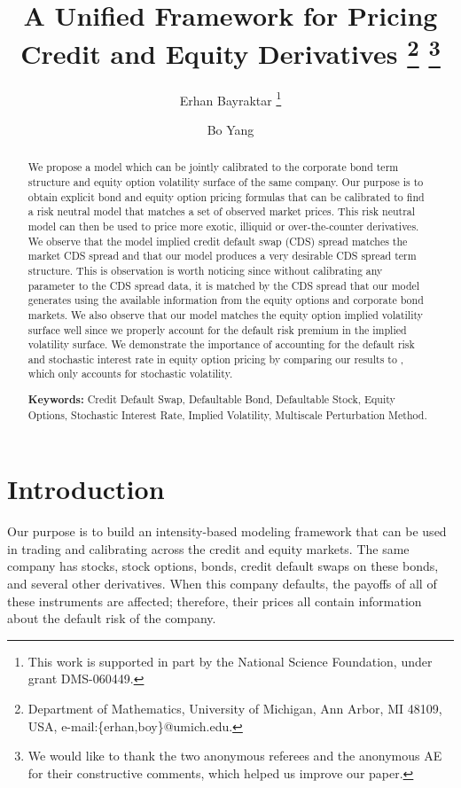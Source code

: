 \documentclass[11pt]{article}
\title{\LARGE \bf
\sc A Unified Framework for Pricing Credit and Equity Derivatives \thanks{Department of Mathematics, University
of Michigan, Ann Arbor, MI 48109, USA, e-mail:\{erhan,boy\}@umich.edu.} \thanks{We would like to thank the two anonymous referees and the anonymous AE for their constructive comments, which helped us improve our paper.} }
\author{Erhan Bayraktar \thanks{This
work is supported in part by the National Science Foundation,
under grant DMS-060449.} \and Bo Yang}
\date{}
\numberwithin{equation}{section}
\begin{document}
\maketitle

\begin{abstract}
We propose a model which can be jointly calibrated to the corporate bond term structure and equity option volatility surface of the same company. Our purpose is to obtain explicit bond and equity option pricing formulas that can be calibrated 
to find a risk neutral model that matches a set of observed market prices. This risk neutral model can then be used to price more exotic, illiquid or over-the-counter derivatives. 
We observe that the model implied credit default swap (CDS) spread matches the market CDS spread and that our model produces a very desirable CDS spread term structure. This is observation is worth noticing since without calibrating any parameter to the CDS spread data, it is matched by the CDS spread that our model generates using the available information from the equity options and corporate bond markets.
We also observe that our model matches the equity option implied volatility surface well since we properly account for the default risk premium in the implied volatility surface.
We demonstrate the importance of accounting for the default risk and stochastic interest rate in equity option pricing by comparing our results to \cite{ronnie-timescale}, which only accounts for stochastic volatility. 

\noindent \textbf{Keywords:} Credit Default Swap, Defaultable Bond, Defaultable Stock, Equity Options, Stochastic Interest Rate, Implied Volatility, Multiscale Perturbation Method.
\end{abstract}

\tableofcontents

\section{Introduction}

Our purpose is to build an intensity-based modeling framework that can be used in trading and calibrating across the credit and equity markets. The same company has  stocks, stock options, bonds, credit default swaps on these bonds, and several other derivatives. When this company defaults, the payoffs of all of these instruments are affected; therefore, their prices all contain information about the default risk of the company. 
\end{document}
